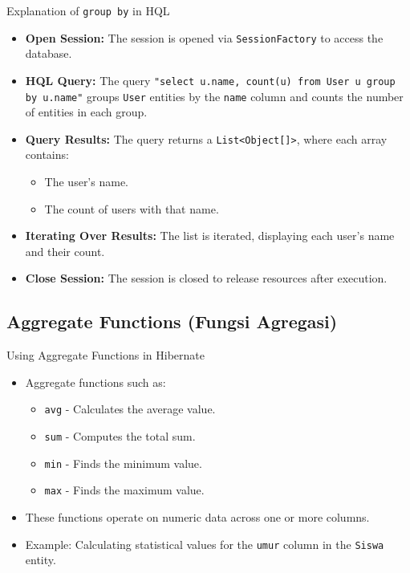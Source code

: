 \documentclass[aspectratio=169, table]{beamer}
\begin{document}
\begin{frame}{Explanation of \texttt{group by} in HQL}
	\vspace{20pt}
	\begin{itemize}
		\item \textbf{Open Session:} The session is opened via \texttt{SessionFactory} to access the database.
		\item \textbf{HQL Query:} The query \texttt{"select u.name, count(u) from User u group by u.name"} groups \texttt{User} entities by the \texttt{name} column and counts the number of entities in each group.
		\item \textbf{Query Results:} The query returns a \texttt{List<Object[]>}, where each array contains:
		\begin{itemize}
			\item The user's name.
			\item The count of users with that name.
		\end{itemize}
		\item \textbf{Iterating Over Results:} The list is iterated, displaying each user's name and their count.
		\item \textbf{Close Session:} The session is closed to release resources after execution.
	\end{itemize}
\end{frame}

\subsection{Aggregate Functions (Fungsi Agregasi)}

\begin{frame}{Using Aggregate Functions in Hibernate}
	\vspace{20pt}
	\begin{itemize}
		\item Aggregate functions such as:
		\begin{itemize}
			\item \texttt{avg} - Calculates the average value.
			\item \texttt{sum} - Computes the total sum.
			\item \texttt{min} - Finds the minimum value.
			\item \texttt{max} - Finds the maximum value.
		\end{itemize}
		\item These functions operate on numeric data across one or more columns.
		\item Example: Calculating statistical values for the \texttt{umur} column in the \texttt{Siswa} entity.
	\end{itemize}
\end{frame}
\end{document}
